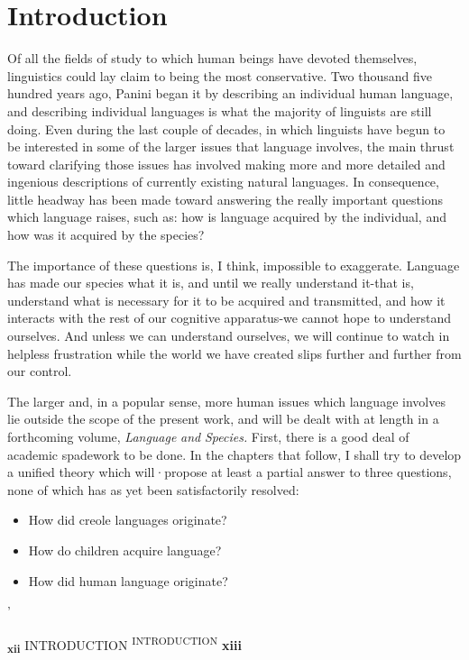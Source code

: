 \chapter{Introduction}

Of all the fields of study to which human beings have devoted themselves, linguistics could lay claim to being the most conservative. Two thousand five hundred years ago, Panini began it by describing an individual human language, and describing individual languages is what the majority of linguists are still doing. Even during the last couple of decades, in which linguists have begun to be interested in some of the larger issues that language involves, the main thrust toward clarifying those issues has involved making more and more detailed and ingenious descriptions of currently existing natural languages. In consequence, little headway has been made toward answering the really important questions which language raises, such as: how is language acquired by the individual, and how was it acquired by the species?

The importance of these questions is, I think, impossible to exaggerate. Language has made our species what it is, and until we really understand it-that is, understand what is necessary for it to be acquired and transmitted, and how it interacts with the rest of our cognitive apparatus-we cannot hope to understand ourselves. And unless we can understand ourselves, we will continue to watch in helpless frustration while the world we have created slips further and further from our control.

The larger and, in a popular sense, more human issues which language involves lie outside the scope of the present work, and will be dealt with at length in a forthcoming volume, \textit{Language} \textit{and} \textit{Species.} First, there is a good deal of academic spadework to be done. In the chapters that follow, I shall try to develop a unified theory which will·propose at least a partial answer to three questions, none of which has as yet been satisfactorily resolved:


\begin{itemize}
\item How did creole languages originate?
\item How do children acquire language?
\item How did human language originate?
\end{itemize}

'

\textbf{\textsubscript{xii }}INTRODUCTION \textsuperscript{INTRODUCTION} \textbf{xiii}

